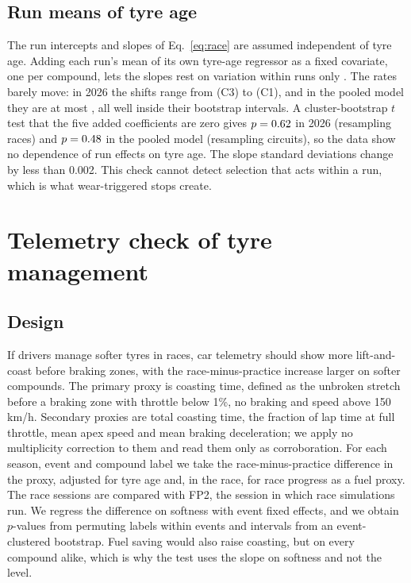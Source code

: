 \subsection{Run means of tyre age}\label{app:mundlak}

The run intercepts and slopes of Eq.~\eqref{eq:race} are assumed independent of tyre age.
Adding each run's mean of its own tyre-age regressor as a fixed covariate, one per compound, lets the slopes rest on variation within runs only \citep[pp.~1056--1057]{bell2019fixed}.
The rates barely move: in 2026 the shifts range from \MundlakSixShiftThree\spl{} (C3) to \MundlakSixShiftOne\spl{} (C1), and in the pooled model they are at most \MundlakPoolShiftFive\spl, all well inside their bootstrap intervals.
A cluster-bootstrap $t$ test that the five added coefficients are zero gives $p=0.62$ in 2026 (resampling races) and $p=0.48$ in the pooled model (resampling circuits), so the data show no dependence of run effects on tyre age.
The slope standard deviations change by less than 0.002\spl.
This check cannot detect selection that acts within a run, which is what wear-triggered stops create.

\section{Telemetry check of tyre management}\label{app:tele}

\subsection{Design}

If drivers manage softer tyres in races, car telemetry should show more lift-and-coast before braking zones, with the race-minus-practice increase larger on softer compounds.
The primary proxy is coasting time, defined as the unbroken stretch before a braking zone with throttle below 1\%, no braking and speed above 150\,km/h.
Secondary proxies are total coasting time, the fraction of lap time at full throttle, mean apex speed and mean braking deceleration; we apply no multiplicity correction to them and read them only as corroboration.
For each season, event and compound label we take the race-minus-practice difference in the proxy, adjusted for tyre age and, in the race, for race progress as a fuel proxy.
The race sessions are compared with FP2, the session in which race simulations run.
We regress the difference on softness with event fixed effects, and we obtain $p$-values from permuting labels within events and intervals from an event-clustered bootstrap.
Fuel saving would also raise coasting, but on every compound alike, which is why the test uses the slope on softness and not the level.

